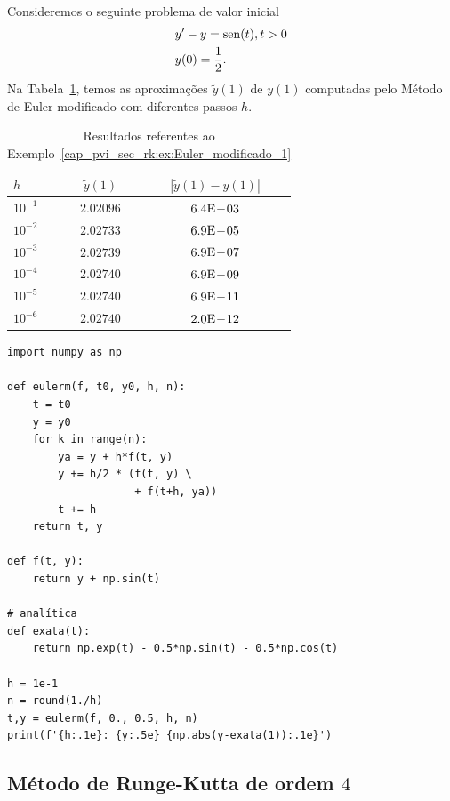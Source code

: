 \begin{ex}\label{cap_pvi_sec_rk:ex:Euler_modificado_1}
  Consideremos o seguinte problema de valor inicial
  \begin{subequations}
    \begin{align}
      &y' - y = \operatorname{sen}(t), t>0\\
      &y(0) = \frac{1}{2}.
    \end{align}
\end{subequations}
Na Tabela~\ref{cap_pvi_sec_rk:tab:ex_Euler_modificado_1}, temos as aproximações $\tilde{y}(1)$ de $y(1)$ computadas pelo Método de Euler modificado com diferentes passos $h$.
 
  \begin{table}[H]
    \centering
    \begin{tabular}{l|cc}
      $h$ & $\tilde{y}(1)$ & $|\tilde{y}(1)-y(1)|$\\\hline
      $10^{-1}$ & $2.02096$ & $6.4\mathrm{E}\!-\!03$ \\
      $10^{-2}$ & $2.02733$ & $6.9\mathrm{E}\!-\!05$ \\
      $10^{-3}$ & $2.02739$ & $6.9\mathrm{E}\!-\!07$ \\
      $10^{-4}$ & $2.02740$ & $6.9\mathrm{E}\!-\!09$ \\
      $10^{-5}$ & $2.02740$ & $6.9\mathrm{E}\!-\!11$ \\
      $10^{-6}$ & $2.02740$ & $2.0\mathrm{E}\!-\!12$ \\\hline
    \end{tabular}
    \caption{Resultados referentes ao Exemplo~\ref{cap_pvi_sec_rk:ex:Euler_modificado_1}}
    \label{cap_pvi_sec_rk:tab:ex_Euler_modificado_1}
  \end{table}

\begin{lstlisting}[caption=eulerm.py]
import numpy as np

def eulerm(f, t0, y0, h, n):
    t = t0
    y = y0
    for k in range(n):
        ya = y + h*f(t, y)
        y += h/2 * (f(t, y) \
                    + f(t+h, ya))
        t += h
    return t, y

def f(t, y):
    return y + np.sin(t)

# analítica
def exata(t):
    return np.exp(t) - 0.5*np.sin(t) - 0.5*np.cos(t)

h = 1e-1
n = round(1./h)
t,y = eulerm(f, 0., 0.5, h, n)
print(f'{h:.1e}: {y:.5e} {np.abs(y-exata(1)):.1e}')
\end{lstlisting}
\end{ex}

\subsection{Método de Runge-Kutta de ordem $4$}

